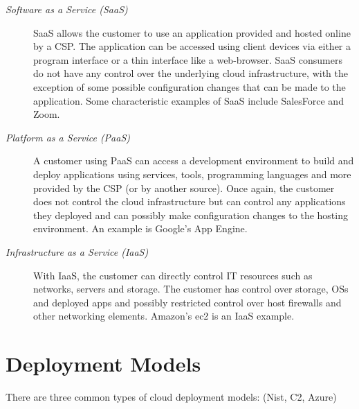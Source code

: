 \begin{description}
    \item [\textit{Software as a Service (SaaS)}] SaaS allows the customer to use an application provided and hosted online by a CSP. The application can be accessed using client devices via either a program interface or a thin interface like a web-browser. SaaS consumers do not have any control over the underlying cloud infrastructure, with the exception of some possible configuration changes that can be made to the application. Some characteristic examples of SaaS include SalesForce and Zoom.

    \item [\textit{Platform as a Service (PaaS)}] A customer using PaaS can access a development environment to build and deploy applications using services, tools, programming languages and more provided by the CSP (or by another source). Once again, the customer does not control the cloud infrastructure but can control any applications they deployed and can possibly make configuration changes to the hosting environment. An example is Google's App Engine.

    \item [\textit{Infrastructure as a Service (IaaS)}] With IaaS, the customer can directly control IT resources such as networks, servers and storage. The customer has control over storage, OSs and deployed apps and possibly restricted control over host firewalls and other networking elements. Amazon's \ac{ec2} is an IaaS example.
\end{description}


\section{Deployment Models}
There are three common types of cloud deployment models: (Nist, C2, Azure)

